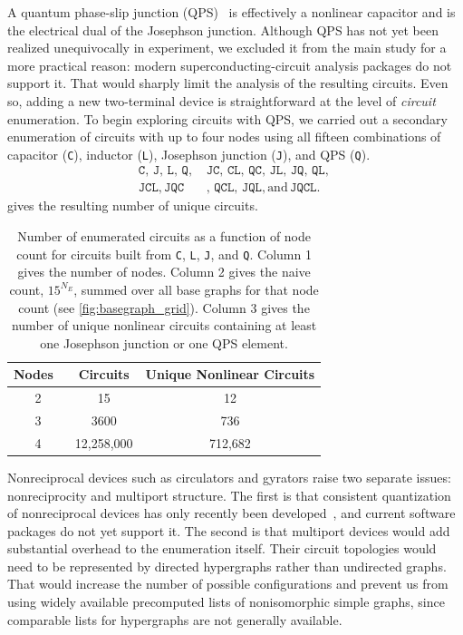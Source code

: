 A quantum phase-slip junction (QPS)~\cite{Mooij_QPS_2006} is effectively a nonlinear capacitor and is the electrical dual of the Josephson junction. Although QPS has not yet been realized unequivocally in experiment, we excluded it from the main study for a more practical reason: modern superconducting-circuit analysis packages do not support it. That would sharply limit the analysis of the resulting circuits. Even so, adding a new two-terminal device is straightforward at the level of \textit{circuit} enumeration. To begin exploring circuits with QPS, we carried out a secondary enumeration of circuits with up to four nodes using all fifteen combinations of capacitor (\verb|C|), inductor (\verb|L|), Josephson junction (\verb|J|), and QPS (\verb|Q|).
\begin{align*}
\texttt{C},\, \texttt{J},\, \texttt{L},\, \texttt{Q},\, &\texttt{JC},\, \texttt{CL},\, \texttt{QC},\, \texttt{JL},\,\texttt{JQ},\, \texttt{QL},\, \\ 
\texttt{JCL},\, \texttt{JQC}&, \, \texttt{QCL}, \, \texttt{JQL}, \textrm{and}\, \texttt{JQCL}.
\end{align*}
 gives the resulting number of unique circuits.

\begin{table}[htbp]
\setlength{\tabcolsep}{15pt}
\begin{tabular}{@{}ccc@{}}
\toprule
Nodes \,\,      &  Circuits&  Unique Nonlinear Circuits  \\ \toprule
2                  & 15          &   12          \\ \midrule
3                  & 3600        &   736         \\ \midrule
4                  & 12,258,000    &   712,682 \\ \bottomrule
\end{tabular}
 \caption{Number of enumerated circuits as a function of node count for circuits built from \texttt{C}, \texttt{L}, \texttt{J}, and \texttt{Q}. Column 1 gives the number of nodes. Column 2 gives the naive count, $15^{N_E}$, summed over all base graphs for that node count (see \cref{fig:basegraph_grid}). Column 3 gives the number of unique nonlinear circuits containing at least one Josephson junction or one QPS element.}\label{tab:qps_enum}
\end{table}

Nonreciprocal devices such as circulators and gyrators raise two separate issues: nonreciprocity and multiport structure. The first is that consistent quantization of nonreciprocal devices has only recently been developed~\cite{parra-rodriguez2023}, and current software packages do not yet support it. The second is that multiport devices would add substantial overhead to the enumeration itself. Their circuit topologies would need to be represented by directed hypergraphs rather than undirected graphs. That would increase the number of possible configurations and prevent us from using widely available precomputed lists of nonisomorphic simple graphs, since comparable lists for hypergraphs are not generally available.


